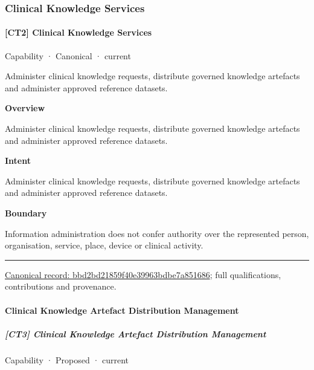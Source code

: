 \subsubsection{Clinical Knowledge Services}

\paragraph{[CT2] Clinical Knowledge Services}

\label{element:bbd2bd21859f40e39963bdbe7a851686}
{\small Capability · Canonical · current}\par

Administer clinical knowledge requests, distribute governed knowledge artefacts and administer approved reference datasets.



\textbf{Overview}



Administer clinical knowledge requests, distribute governed knowledge artefacts and administer approved reference datasets.



\textbf{Intent}



Administer clinical knowledge requests, distribute governed knowledge artefacts and administer approved reference datasets.



\textbf{Boundary}



Information administration does not confer authority over the represented person, organisation, service, place, device or clinical activity.



\medskip\hrule\medskip

{\footnotesize \href{../../../../continuum/strategy/capability/bbd2bd21859f40e39963bdbe7a851686.md}{Canonical record: bbd2bd21859f40e39963bdbe7a851686}; full qualifications, contributions and provenance.}\par
\paragraph{Clinical Knowledge Artefact Distribution Management}

\subparagraph{[CT3] Clinical Knowledge Artefact Distribution Management}

\label{element:cd29a9eb798949bc8bc81bb5d434cabf}
{\small Capability · Proposed · current}\par

